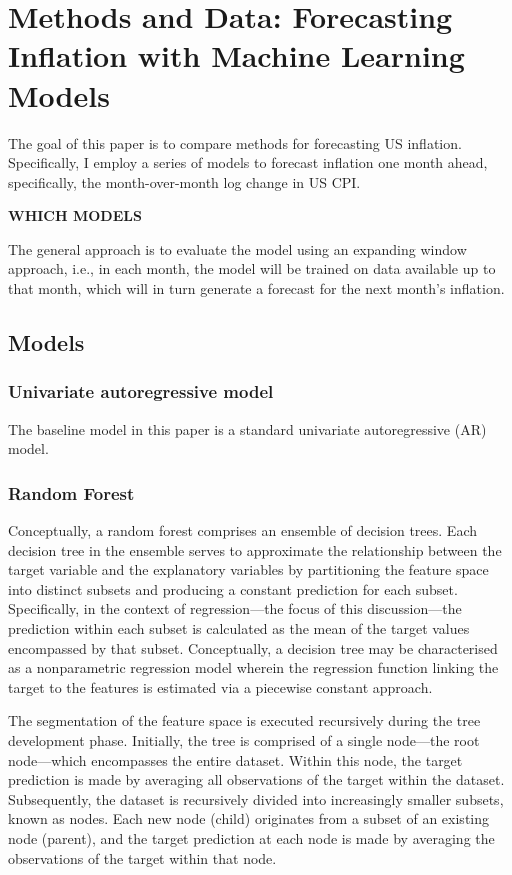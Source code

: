 \pagebreak
\section{Methods and Data: Forecasting Inflation with Machine Learning Models} \label{sec:methods}

The goal of this paper is to compare methods for forecasting US inflation. Specifically, I employ a series of models to forecast inflation one month ahead, specifically, the month-over-month log change in US CPI. 

\textbf{WHICH MODELS}

The general approach is to evaluate the model using an expanding window approach, i.e., in each month, the model will be trained on data available up to that month, which will in turn generate a forecast for the next month's inflation. 



\subsection{Models}

\subsubsection{Univariate autoregressive model}

The baseline model in this paper is a standard univariate autoregressive (AR) model. 


\subsubsection{Random Forest}


Conceptually, a random forest comprises an ensemble of decision trees. Each decision tree in the ensemble serves to approximate the relationship between the target variable and the explanatory variables by partitioning the feature space into distinct subsets and producing a constant prediction for each subset. Specifically, in the context of regression—the focus of this discussion—the prediction within each subset is calculated as the mean of the target values encompassed by that subset. Conceptually, a decision tree may be characterised as a nonparametric regression model wherein the regression function linking the target to the features is estimated via a piecewise constant approach.

The segmentation of the feature space is executed recursively during the tree development phase. Initially, the tree is comprised of a single node—the root node—which encompasses the entire dataset. Within this node, the target prediction is made by averaging all observations of the target within the dataset. Subsequently, the dataset is recursively divided into increasingly smaller subsets, known as nodes. Each new node (child) originates from a subset of an existing node (parent), and the target prediction at each node is made by averaging the observations of the target within that node.

